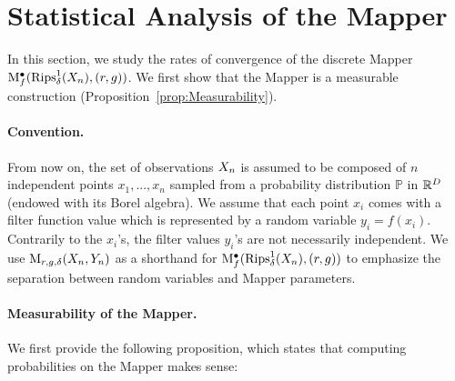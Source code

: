 
\section{Statistical Analysis of the Mapper}
\label{sec:ConfConv}


In this section, we study the rates of convergence of the discrete Mapper ${\rm M}^\bullet_f(\mathrm{Rips}^1_\delta(X_n),(r,g))$.
We first show that the Mapper is a measurable construction (Proposition~\ref{prop:Measurability}).


\paragraph*{Convention.} From now on, the set of observations $X_n$  
is assumed to be composed of $n$ independent points $x_1,...,x_n$ sampled from a probability distribution 
$\mathbb{P}$ in $\mathbb{R}^D$ (endowed with its Borel algebra). We assume that each point $x_i$ comes with a 
filter function value which is represented by a random variable $y_i= f(x_i)$. Contrarily to the $x_i$'s, 
the filter values $y_i$'s are not necessarily independent. 
We use $\mathrm{M}_{r,g,\delta}(X_n,Y_n)$ as a shorthand for $\mathrm{M}_f^\bullet(\mathrm{Rips}_\delta^1(X_n),(r,g))$ to emphasize the 
separation between random variables and Mapper parameters.

\paragraph*{Measurability of the Mapper.} 
We first provide the following proposition, 
which states that computing probabilities on the Mapper makes sense:

